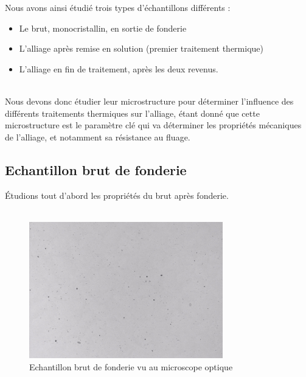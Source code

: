 Nous avons ainsi étudié trois types d'échantillons différents :\\
\begin{itemize}
    \item Le brut, monocristallin, en sortie de fonderie
    \item L'alliage après remise en solution (premier traitement thermique)
    \item L'alliage en fin de traitement, après les deux revenus.\\\\
\end{itemize}



Nous devons donc étudier leur microstructure pour déterminer l'influence des 
différents traitements thermiques sur l'alliage, étant donné que cette microstructure
est le paramètre clé qui va déterminer les propriétés mécaniques de l'alliage,
et notamment sa résistance au fluage.

\subsection*{Echantillon brut de fonderie}

Étudions tout d'abord les propriétés du brut après fonderie.\\\\



\begin{figure}[htbp]
    \centering
    \includegraphics[width=0.75\textwidth]{images_optique/brut.pdf}
    \caption{Echantillon brut de fonderie vu au microscope optique}
    \label{}
\end{figure}


